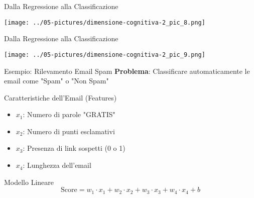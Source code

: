 \documentclass[aspectratio=169]{beamer}
\begin{document}
%
\begin{frame}{Dalla Regressione alla Classificazione}
\begin{center}
\texttt{[image: ../05-pictures/dimensione-cognitiva-2\_pic\_8.png]} 
\end{center}
\end{frame}
%
%
\begin{frame}{Dalla Regressione alla Classificazione}
\begin{center}
\texttt{[image: ../05-pictures/dimensione-cognitiva-2\_pic\_9.png]} 
\end{center}
\end{frame}
%
%
\begin{frame}{Esempio: Rilevamento Email Spam}
\textbf{Problema}: Classificare automaticamente le email come "Spam" o "Non Spam"

\vspace{0.5cm}

\begin{block}{Caratteristiche dell'Email (Features)}
\begin{itemize}
    \item $x_1$: Numero di parole "GRATIS"
    \item $x_2$: Numero di punti esclamativi
    \item $x_3$: Presenza di link sospetti (0 o 1)
    \item $x_4$: Lunghezza dell'email
\end{itemize}
\end{block}

\vspace{0.5cm}

\begin{block}{Modello Lineare}
$$\text{Score} = w_1 \cdot x_1 + w_2 \cdot x_2 + w_3 \cdot x_3 + w_4 \cdot x_4 + b$$
\end{block}

\end{frame}
%
%
\end{document}
